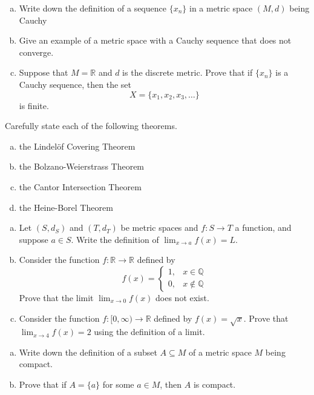 \documentclass[11pt]{exam}
\theoremstyle{definition}
\begin{document}
\begin{questions}
\newpage
\question[10]\mbox{}

\begin{enumerate}[(a)]
\item
Write down the definition of a sequence $\{x_n\}$ in a metric space $(M,d)$ being Cauchy
\vspace{1in}
\item
Give an example of a metric space with a Cauchy sequence that does not converge.
\vspace{2in}
\item 
Suppose that $M=\mathbb R$ and $d$ is the discrete metric.  Prove that if $\{x_n\}$ is a Cauchy sequence, then the set
$$X = \{x_1,x_2,x_3,\dots\}$$
is finite.
\end{enumerate}

\newpage
\question[10]\mbox{}
Carefully state each of the following theorems.
\begin{enumerate}[(a)]
\item the Lindel\"{o}f Covering Theorem
\vspace{2in}
\item the Bolzano-Weierstrass Theorem
\vspace{2in}
\item the Cantor Intersection Theorem
\vspace{2in}
\item the Heine-Borel Theorem
\end{enumerate}

\newpage
\question[10]\mbox{}

\begin{enumerate}[(a)]
\item  Let $(S,d_S)$ and $(T,d_T)$ be metric spaces and $f: S\rightarrow T$ a function, and suppose $a\in S$.
Write the definition of $\lim_{x\rightarrow a} f(x) = L$.
\vspace{1in}
\item  Consider the function $f:\mathbb{R}\rightarrow\mathbb{R}$ defined by
$$f(x) = \left\lbrace\begin{array}{cc}
1, & x\in\mathbb{Q}\\
0, & x\notin\mathbb{Q}
\end{array}\right.$$
Prove that the limit $\lim_{x\rightarrow 0} f(x)$ does not exist.
\vspace{2.5in}
\item  Consider the function $f:[0,\infty)\rightarrow\mathbb{R}$ defined by $f(x) = \sqrt{x}$.
Prove that $\lim_{x\rightarrow 4} f(x) = 2$ using the definition of a limit.

\end{enumerate}

\newpage
\question[10]\mbox{}
\begin{enumerate}[(a)]
\item Write down the definition of a subset $A\subseteq M$ of a metric space $M$ being compact.
\vspace{2in}
\item Prove that if $A = \{a\}$ for some $a\in M$, then $A$ is compact.
\end{enumerate}


\end{questions}
\end{document}
